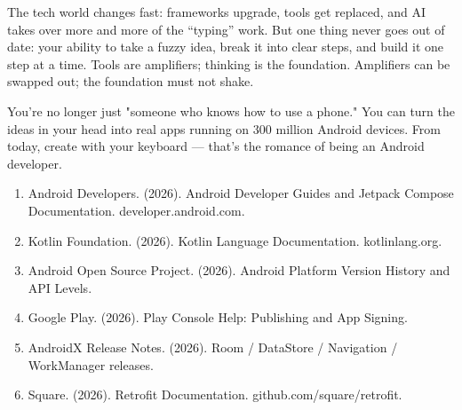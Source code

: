 The tech world changes fast: frameworks upgrade, tools get replaced, and AI takes over more and more of the “typing” work. But one thing never goes out of date: your ability to take a fuzzy idea, break it into clear steps, and build it one step at a time. Tools are amplifiers; thinking is the foundation. Amplifiers can be swapped out; the foundation must not shake.

You're no longer just "someone who knows how to use a phone." You can turn the ideas in your head into real apps running on 300 million Android devices. From today, create with your keyboard — that's the romance of being an Android developer.


\begin{enumerate}
  \item Android Developers. (2026). Android Developer Guides and Jetpack Compose Documentation. developer.android.com.
  \item Kotlin Foundation. (2026). Kotlin Language Documentation. kotlinlang.org.
  \item Android Open Source Project. (2026). Android Platform Version History and API Levels.
  \item Google Play. (2026). Play Console Help: Publishing and App Signing.
  \item AndroidX Release Notes. (2026). Room / DataStore / Navigation / WorkManager releases.
  \item Square. (2026). Retrofit Documentation. github.com/square/retrofit.
\end{enumerate}
